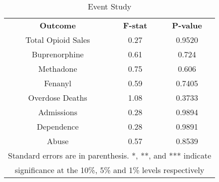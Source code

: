 \documentclass[11pt]{article}
\begin{document}
\begin{table}[htb]
\centering
\scriptsize
\caption{Event Study} 
\label{DDD Event Study}
\begin{tabular}{ccc}
\hline \hline
 \textbf{Outcome} & \textbf{F-stat} & \textbf{P-value} \\
Total Opioid Sales &0.27 & 0.9520 \\
Buprenorphine & 0.61 & 0.724 \\
Methadone &0.75 & 0.606\\
Fenanyl  &0.59 & 0.7405 \\
Overdose Deaths  &1.08 & 0.3733\\
Admissions  &0.28 & 0.9894 \\
Dependence  &0.28 & 0.9891 \\
Abuse  &0.57 & 0.8539\\
\hline
\multicolumn{3}{c}{\tiny{Standard errors are in parenthesis.  *, **, and *** indicate }} \\
\multicolumn{3}{c}{\tiny{significance at the 10\%, 5\% and 1\% levels respectively}} \\
\hline
\end{tabular}
\end{table}
\end{document}
